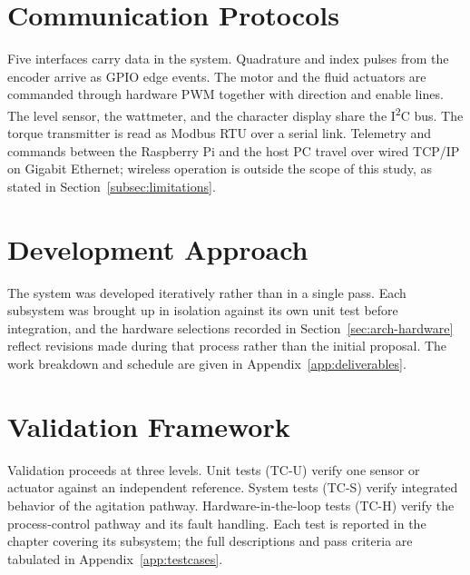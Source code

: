 \section{Communication Protocols}
\label{sec:arch-protocols}


Five interfaces carry data in the system. Quadrature and index pulses from the encoder arrive as GPIO edge events. The motor and the fluid actuators are commanded through hardware PWM together with direction and enable lines. The level sensor, the wattmeter, and the character display share the I\textsuperscript{2}C bus. The torque transmitter is read as Modbus RTU over a serial link. Telemetry and commands between the Raspberry Pi and the host PC travel over wired TCP/IP on Gigabit Ethernet; wireless operation is outside the scope of this study, as stated in Section~\ref{subsec:limitations}.


\section{Development Approach}
\label{sec:arch-process-model}

The system was developed iteratively rather than in a single pass. Each subsystem was brought up in isolation against its own unit test before integration, and the hardware selections recorded in Section~\ref{sec:arch-hardware} reflect revisions made during that process rather than the initial proposal. The work breakdown and schedule are given in Appendix~\ref{app:deliverables}.



\section{Validation Framework}
\label{sec:arch-validation}

Validation proceeds at three levels. Unit tests (TC-U) verify one sensor or actuator against an independent reference. System tests (TC-S) verify integrated behavior of the agitation pathway. Hardware-in-the-loop tests (TC-H) verify the process-control pathway and its fault handling. Each test is reported in the chapter covering its subsystem; the full descriptions and pass criteria are tabulated in Appendix~\ref{app:testcases}.

